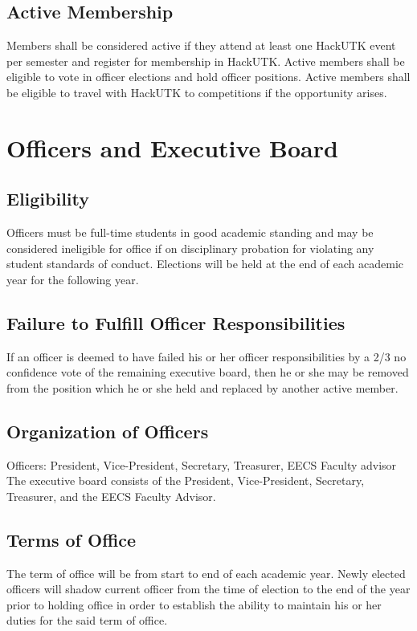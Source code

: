 \documentclass[12pt]{article}
\begin{document}
\subsection{Active Membership}
Members shall be considered active if they attend at least one HackUTK event per semester and register for membership in HackUTK. Active members shall be eligible to vote in officer elections and hold officer positions. Active members shall be eligible to travel with HackUTK to competitions if the opportunity arises. 

\section{Officers and Executive Board}
\subsection{Eligibility}
Officers must be full-time students in good academic standing and may be considered ineligible for office if on disciplinary probation for violating any student standards of conduct. Elections will be held at the end of each academic year for the following year.

\subsection{Failure to Fulfill Officer Responsibilities}
If an officer is deemed to have failed his or her officer responsibilities by a 2/3 no confidence vote of the remaining executive board, then he or she may be removed from the position which he or she held and replaced by another active member.

\subsection{Organization of Officers}
Officers: President, Vice-President, Secretary, Treasurer, EECS Faculty advisor
The executive board consists of the President, Vice-President, Secretary, Treasurer, and the EECS Faculty Advisor.

\subsection{Terms of Office}
The term of office will be from start to end of each academic year. Newly elected officers will shadow current officer from the time of election to the end of the year prior to holding office in order to establish the ability to maintain his or her duties for the said term of office.
\end{document}
